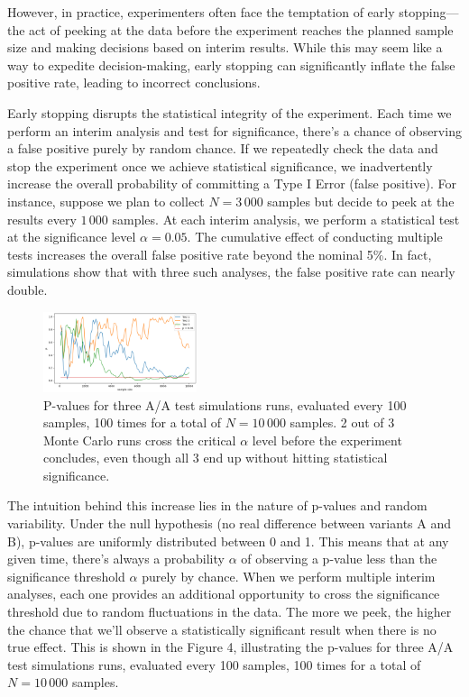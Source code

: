 \documentclass[final,5p,times,twocolumn,authoryear]{elsarticle}
\begin{document}
However, in practice, experimenters often face the temptation of early stopping—the act of peeking at the data before the experiment reaches the planned sample size and making decisions based on interim results. While this may seem like a way to expedite decision-making, early stopping can significantly inflate the false positive rate, leading to incorrect conclusions.

Early stopping disrupts the statistical integrity of the experiment. Each time we perform an interim analysis and test for significance, there's a chance of observing a false positive purely by random chance. If we repeatedly check the data and stop the experiment once we achieve statistical significance, we inadvertently increase the overall probability of committing a Type I Error (false positive). For instance, suppose we plan to collect $ N = 3\,000 $ samples but decide to peek at the results every $ 1\,000 $ samples. At each interim analysis, we perform a statistical test at the significance level $ \alpha = 0.05 $. The cumulative effect of conducting multiple tests increases the overall false positive rate beyond the nominal 5\%. In fact, simulations show that with three such analyses, the false positive rate can nearly double.

\begin{figure}[h]
	\centering 
	\includegraphics[width=0.4\textwidth]{fig-4.png}	
	\caption{P-values for three A/A test simulations runs, evaluated every 100 samples, 100 times for a total of $ N=10\,000$ samples. 2 out of 3 Monte Carlo runs cross the critical $\alpha$ level before the experiment concludes, even though all 3 end up without hitting statistical significance.} 
\end{figure}

The intuition behind this increase lies in the nature of p-values and random variability. Under the null hypothesis (no real difference between variants A and B), p-values are uniformly distributed between 0 and 1. This means that at any given time, there's always a probability $ \alpha $ of observing a p-value less than the significance threshold $ \alpha $ purely by chance. When we perform multiple interim analyses, each one provides an additional opportunity to cross the significance threshold due to random fluctuations in the data. The more we peek, the higher the chance that we'll observe a statistically significant result when there is no true effect. This is shown in the Figure 4, illustrating the p-values for three A/A test simulations runs, evaluated every 100 samples, 100 times for a total of $ N=10\,000$ samples.
\end{document}
